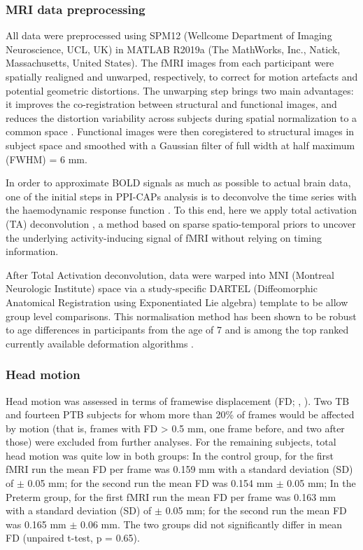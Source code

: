 \subsubsection{MRI data preprocessing} 
All data were preprocessed using SPM12 (Wellcome Department of Imaging Neuroscience, UCL, UK) in MATLAB R2019a (The MathWorks, Inc., Natick, Massachusetts, United States). The fMRI images from each participant were spatially realigned and unwarped, respectively, to correct for motion artefacts and potential geometric distortions. The unwarping step brings two main advantages: it improves the co-registration between structural and functional images, and reduces the distortion variability across subjects during spatial normalization to a common space \citep{Hutton2002}. Functional images were then coregistered to structural images in subject space and smoothed with a Gaussian filter of full width at half maximum (FWHM) = 6 mm. 

In order to approximate BOLD signals as much as possible to actual brain data, one of the initial steps in PPI-CAPs analysis is to deconvolve the time series with the haemodynamic response function \citep{Freitas2020}. To this end, here we apply total activation (TA) deconvolution \citep{Karahanoglu2013}, a method based on sparse spatio-temporal priors to uncover the underlying activity-inducing signal of fMRI without relying on timing information.

After Total Activation deconvolution, data were warped into MNI (Montreal Neurologic Institute) space via a study-specific DARTEL (Diffeomorphic Anatomical Registration using Exponentiated Lie algebra) template to be allow group level comparisons. This normalisation method has been shown to be robust to age differences in participants from the age of 7 \citep{ASHBURNER1998, Burgund2002} and is among the top ranked currently available deformation algorithms \citep{Klein2009}.  


\subsubsection{Head motion} 
Head motion was assessed in terms of framewise displacement (FD; \citeauthor{Power2014a}, \citeyear{Power2014a}). Two TB and fourteen PTB subjects for whom more than 20\% of frames would be affected by motion (that is, frames with FD > 0.5 mm, one frame before, and two after those) were excluded from further analyses. For the remaining subjects, total head motion was quite low in both groups: In the control group, for the first fMRI run the mean FD per frame was 0.159 mm with a standard deviation (SD) of $\pm$ 0.05 mm; for the second run the mean FD was 0.154 mm $\pm$ 0.05 mm; In the Preterm group, for the first fMRI run the mean FD per frame was 0.163 mm with a standard deviation (SD) of $\pm$ 0.05 mm; for the second run the mean FD was 0.165 mm $\pm$ 0.06 mm. The two groups did not significantly differ in mean FD (unpaired t-test, p = 0.65). %

